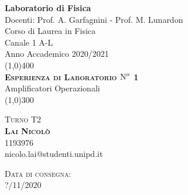 \documentclass[a4paper,10pt]{article}
\begin{document}
	\def\subsectionautorefname{Sezione}	
	\def\subsubsectionautorefname{Sezione}
	\begin{titlepage}
		\begin{center}
			\Huge{\bfseries Laboratorio di Fisica}\\
				
			\LARGE Docenti: Prof. A. Garfagnini - Prof. M. Lunardon \\
			\Large Corso di Laurea in Fisica\\
			\Large Canale 1 A-L\\
			\Large Anno Accademico 2020/2021\\
			[1cm]
			\line(1,0){400}\\
			[2cm]
				
			\textsc{\huge{\bfseries  Esperienza di Laboratorio $\text N^o$ 1}}\\
			\huge{Amplificatori Operazionali}\\
			[2mm]
			\line(1,0){300}\\
			[12cm]
					
		\end{center}
		
			
			\textsc{\Large Turno T2}\\
			[0.5cm]
			\textsc{\large {\bfseries Lai Nicolò}} \\ 
			\indent\large 1193976 \\ 
			\indent\large nicolo.lai@studenti.unipd.it\\
			
				
				
		\begin{flushright}
				\textsc{\Large Data di consegna:}\\
				\textsc{\large ?/11/2020}					
		\end{flushright}
				
	\end{titlepage}
\cleardoublepage


	
\end{document}
